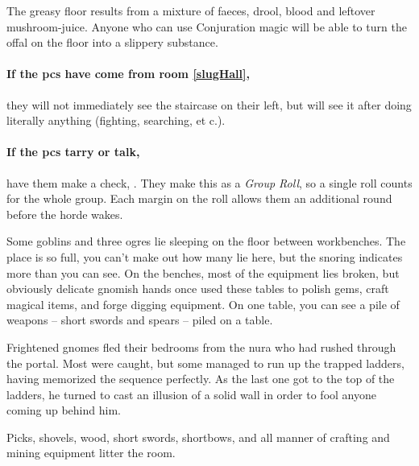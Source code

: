 \begin{multicols}{2}
The greasy floor results from a mixture of faeces, drool, blood and leftover mushroom-juice.
Anyone who can use Conjuration magic will be able to turn the offal on the floor into a slippery substance.

\paragraph{If the \glspl{pc} have come from room \ref{slugHall},}
they will not immediately see the staircase on their left, but will see it after doing literally anything (fighting, searching, et c.).

\paragraph{If the \glspl{pc} tarry or talk,}
have them make a  check, \tn[6].
They make this as a \textit{Group Roll}, so a single roll counts for the whole group.
Each margin on the roll allows them an additional round before the horde wakes.


\label{laddertop}

\begin{boxtext}

  Some goblins and three ogres lie sleeping on the floor between workbenches.
  The place is so full, you can't make out how many lie here, but the snoring indicates more than you can see.
  On the benches, most of the equipment lies broken, but obviously delicate gnomish hands once used these tables to polish gems, craft magical items, and forge digging equipment.
  On one table, you can see a pile of weapons -- short swords and spears -- piled on a table.

\end{boxtext}

\begin{exampletext}

  Frightened gnomes fled their bedrooms from the nura who had rushed through the portal.
  Most were caught, but some managed to run up the trapped ladders, having memorized the sequence perfectly.
  As the last one got to the top of the ladders, he turned to cast an illusion of a solid wall in order to fool anyone coming up behind him.

\end{exampletext}

Picks, shovels, wood, short swords, shortbows, and all manner of crafting and mining equipment litter the room.


\end{multicols}
